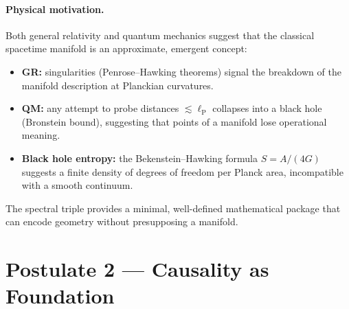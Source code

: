 \documentclass[12pt,a4paper]{article}
\theoremstyle{postulate}
\newcommand{\planck}{\ell_{\mathrm{P}}}
\begin{document}
\paragraph{Physical motivation.}
Both general relativity and quantum mechanics suggest that the classical
spacetime manifold is an approximate, emergent concept:
\begin{itemize}
  \item \textbf{GR:} singularities (Penrose--Hawking theorems) signal the
        breakdown of the manifold description at Planckian curvatures.
  \item \textbf{QM:} any attempt to probe distances $\lesssim \planck$
        collapses into a black hole (Bronstein bound), suggesting that points
        of a manifold lose operational meaning.
  \item \textbf{Black hole entropy:} the Bekenstein--Hawking formula
        $S = A/(4G)$ suggests a finite density of degrees of freedom per
        Planck area, incompatible with a smooth continuum.
\end{itemize}
The spectral triple provides a minimal, well-defined mathematical package
that can encode geometry without presupposing a manifold.


\section{Postulate 2 --- Causality as Foundation}\label{sec:P2}
\end{document}
